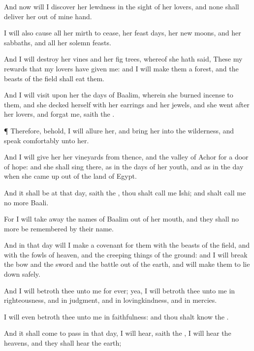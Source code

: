 {And now will I
discover her
lewdness in the
sight of her
lovers, and
none shall
deliver her out of mine
hand.

I will also cause all her
mirth to
cease, her feast
days, her new
moons, and her
sabbaths, and all her solemn
feasts.

And I will
destroy her
vines and her fig
trees, whereof she hath
said, These
{} my
rewards that my
lovers have
given me: and I will
make them a
forest, and the
beasts of the
field shall
eat them.

And I will
visit upon her the
days of
Baalim, wherein she burned
incense to them, and she
decked herself with her
earrings and her
jewels, and she
went
after her
lovers, and
forgat me,
saith the
{}.


\par }{\PP {}¶ Therefore, behold, I will
allure her, and
bring her into the
wilderness, and
speak
comfortably unto her.

And I will
give her her
vineyards from thence, and the
valley of
Achor for a
door of
hope: and she shall
sing there, as in the
days of her
youth, and as in the
day when she came
up out of the
land of
Egypt.

And it shall be at that
day,
saith the
{},
{} thou shalt
call me
Ishi; and shalt
call me no more
Baali.

For I will take
away the
names of
Baalim out of her
mouth, and they shall no more be
remembered by their
name.

And in that
day will I
make a
covenant for them with the
beasts of the
field, and with the
fowls of
heaven, and
{} the creeping
things of the
ground: and I will
break the
bow and the
sword and the
battle out of the
earth, and will make them to lie
down
safely.

And I will
betroth thee unto me for
ever; yea, I will
betroth thee unto me in
righteousness, and in
judgment, and in
lovingkindness, and in
mercies.

I will even
betroth thee unto me in
faithfulness: and thou shalt
know the
{}.

And it shall come to pass in that
day, I will
hear,
saith the
{}, I will
hear the
heavens, and they shall
hear the
earth;

}
